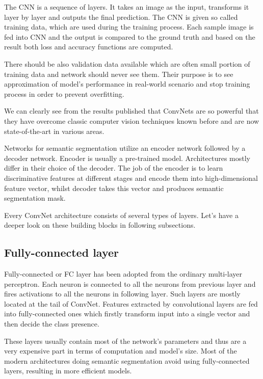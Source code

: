 The CNN is a sequence of layers. It takes an image as the input, transforms
it layer by layer and outputs the final prediction. The CNN is given so called training data,
which are used during the training process. Each sample image
is fed into CNN and the output is compared to the ground truth and based on the result
both loss and accuracy functions are computed.

There should be also validation
data available which are often small portion of training data and network should never see them.
Their purpose is to see approximation of model's performance in real-world scenario and stop
training process in order to prevent overfitting.

We can clearly see from the results published that ConvNets are so powerful that they have
overcome classic computer vision techniques known before and are now
state-of-the-art in various areas.

Networks for semantic segmentation utilize an encoder network followed by a decoder network.
Encoder is usually a pre-trained model. Architectures mostly differ in their choice of the decoder.
The job of the encoder is to learn discriminative features at different stages and
encode them into high-dimensional feature
vector, whilst decoder takes this vector and produces semantic segmentation mask.
\cite{bib:semanticsegoveryears}

Every ConvNet architecture consists of several types of layers. Let's have a deeper
look on these building blocks in following subsections. 

\subsection{Fully-connected layer}
\label{sec:cnn:fclayer}

Fully-connected or FC layer has been adopted from the ordinary multi-layer perceptron.
Each neuron is connected to all the neurons from previous layer and fires activations to all
the neurons in following layer. Such layers are mostly located at the tail of ConvNet.
Features extracted by convolutional layers are fed into fully-connected ones which
firstly transform input into a single vector and then decide the class presence.

These layers usually contain most of the network's parameters and thus are a very expensive
part in terms of computation and model's size.
Most of the modern architectures doing semantic segmentation
avoid using fully-connected layers, resulting in more efficient models.

